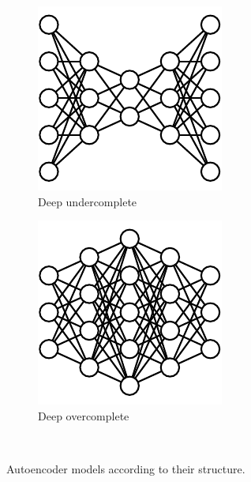 \begin{figure}[h!]
        \hfill\begin{subfigure}[t]{0.45\figwidth}
		\centering
		\includegraphics[width=0.7\linewidth]{DeepUndercomplete.pdf} 
		\caption{Deep undercomplete} \label{Fig.DeepUnder}
	\end{subfigure}
	\hfill
	\begin{subfigure}[t]{0.45\figwidth}
		\centering
		\includegraphics[width=0.7\linewidth]{DeepOvercomplete.pdf} 
		\caption{Deep overcomplete} \label{Fig.DeepOver}
	\end{subfigure}\hfill~\\
        
	\caption{Autoencoder models according to their structure.}
	\label{Fig.Structure}
\end{figure}


